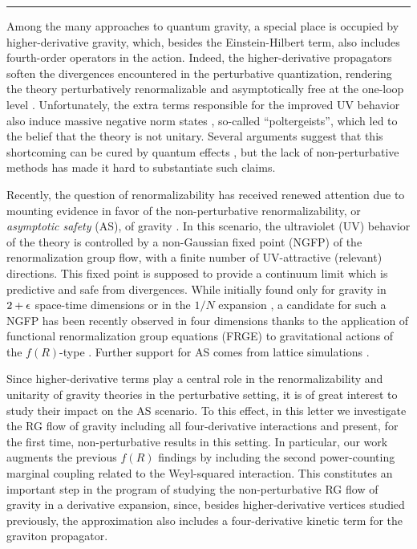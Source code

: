 \documentclass[11pt,reqno]{article}
\newcommand{\2}{\sqrt{2\,}}
\begin{document}
\vspace{5mm}
\hrule\bigskip
\vspace{5mm}


Among the many approaches to quantum gravity, a special place is occupied by higher-derivative gravity, which, besides the Einstein-Hilbert term, also includes fourth-order operators in the action. Indeed, the higher-derivative propagators soften the divergences encountered in the perturbative quantization, rendering the theory perturbatively renormalizable \cite{Stelle:1976gc} and asymptotically free at the one-loop level 
\cite{Julve:1978xn,Fradkin:1981hx,Avramidi:1985ki,deBerredoPeixoto:2004if,Codello:2006in}. 
Unfortunately, the extra terms responsible for the improved UV behavior also induce massive negative norm states \cite{Stelle:1977ry}, so-called ``poltergeists'', which led to the belief that the theory is not unitary. Several arguments suggest that this shortcoming can be cured by quantum effects \cite{Julve:1978xn,Salam:1978fd}, but the lack of non-perturbative methods has made it hard to substantiate such claims.

Recently, the question of renormalizability has received renewed attention due to mounting evidence 
in favor of the non-perturbative renormalizability, or \emph{asymptotic safety} (AS), of gravity \cite{Weinberg:1980gg,Niedermaier,Percacci:2007sz,Reuter:2007rv}.
In this scenario, the ultraviolet (UV) behavior 
of the theory is controlled by a non-Gaussian fixed point (NGFP) of the renormalization group flow, with a finite number of UV-attractive (relevant) directions. This fixed point is supposed to provide a continuum limit which is predictive and safe from divergences.
While initially found only for gravity in $2+\epsilon$ space-time dimensions \cite{Gastmans,Christensen:1978sc} or in the $1/N$ expansion \cite{Smolin:1981rm,Percacci:2006N}, a candidate for
such a NGFP has been recently observed in four dimensions thanks to the application of functional renormalization group equations (FRGE) to gravitational actions of the $f(R)$-type \cite{Souma,LR:2002,RS:2002,Litim:2008,OliverR2,CPR:2008,MS:2008,CPR2:2008}. Further support for AS comes  from lattice 
simulations \cite{Ambjorn:2005qt,AJL2}.

Since higher-derivative terms play a central role in the renormalizability and unitarity of gravity theories in the perturbative setting, it is of great interest to study their impact on the AS scenario. To this effect, in this letter
 we investigate the RG flow of gravity including all four-derivative interactions
and present, for the first time, non-perturbative results in this setting. In particular, our work augments the
previous $f(R)$ findings by including the second power-counting marginal coupling related to the Weyl-squared interaction.
This constitutes an important step in the program of studying the non-perturbative RG flow
of gravity in a derivative expansion, since, besides higher-derivative vertices studied previously, the
approximation also includes a four-derivative kinetic term for the graviton propagator.
\end{document}
